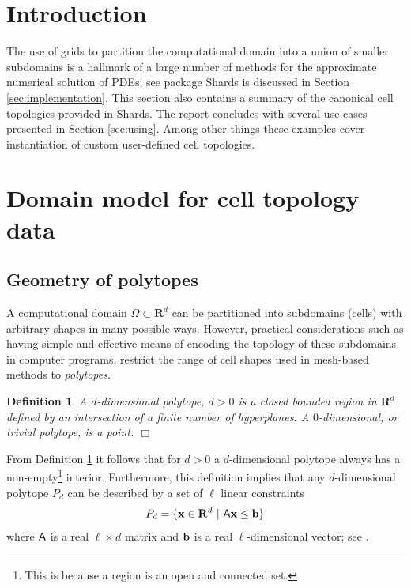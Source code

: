 \documentclass[pdf,12pt,relaxed]{SANDreport}
\newtheorem{defin}{Definition}
\begin{document}
    \section{Introduction}\label{sec:intro}

The use of grids to partition the computational domain into a union of smaller subdomains is a hallmark of a large number of methods for the approximate numerical solution of PDEs; see \cite{trilinos} package Shards is discussed in Section \ref{sec:implementation}. This section also contains a summary of the canonical cell topologies provided in Shards. The report concludes with several use cases presented in Section \ref{sec:using}. Among other things these examples cover instantiation of custom user-defined cell topologies.


    \section{Domain model for cell topology data}\label{sec:model}
    
    \subsection{Geometry of polytopes}
    A computational domain $\Omega\subset \mathbf{R}^d$ can be partitioned into subdomains (cells) with arbitrary shapes in many possible ways. However, practical considerations such as having simple and effective means of encoding the topology of these subdomains in  computer programs, restrict the range of cell shapes used in mesh-based methods  to \emph{polytopes}. 
 
 
     \begin{defin}\label{def:polytope}
     A $d$-dimensional polytope, $d>0$ is a closed bounded region in $\mathbf{R}^d$ defined by an intersection of a finite number of hyperplanes. A $0$-dimensional, or trivial polytope, is a point. \hfill$\Box$
     \end{defin}
                   
      From Definition \ref{def:polytope} it follows that for $d>0$ a $d$-dimensional polytope always has a non-empty\footnote{This is because a region is an open and connected set.} interior. Furthermore, this definition implies that any $d$-dimensional polytope $P_d$ can be described by a set of $\ell$ linear constraints
    \begin{equation}\label{eq:polytope}
    P_d = \{ {\bf x}\in {\mathbf{R}}^d\,\,|\,\, {\sf A}{\bf x} \le {\bf b} \}
    \end{equation}
    where ${\sf A}$ is a real $\ell \times d$ matrix and $\bf{b}$ is a real $\ell$-dimensional vector; see \cite{math:polytope}. 
    
\end{document}

